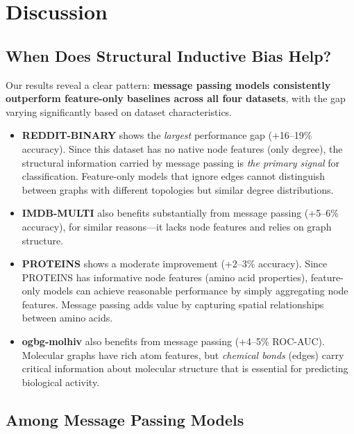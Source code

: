 \documentclass[11pt]{article}
\begin{document}
\section{Discussion}

\subsection{When Does Structural Inductive Bias Help?}

Our results reveal a clear pattern: \textbf{message passing models consistently outperform feature-only baselines across all four datasets}, with the gap varying significantly based on dataset characteristics.

\begin{itemize}
    \item \textbf{REDDIT-BINARY} shows the \textit{largest} performance gap (+16--19\% accuracy). Since this dataset has no native node features (only degree), the structural information carried by message passing is \textit{the primary signal} for classification. Feature-only models that ignore edges cannot distinguish between graphs with different topologies but similar degree distributions.
    
    \item \textbf{IMDB-MULTI} also benefits substantially from message passing (+5--6\% accuracy), for similar reasons—it lacks node features and relies on graph structure.
    
    \item \textbf{PROTEINS} shows a moderate improvement (+2--3\% accuracy). Since PROTEINS has informative node features (amino acid properties), feature-only models can achieve reasonable performance by simply aggregating node features. Message passing adds value by capturing spatial relationships between amino acids.
    
    \item \textbf{ogbg-molhiv} also benefits from message passing (+4--5\% ROC-AUC). Molecular graphs have rich atom features, but \textit{chemical bonds} (edges) carry critical information about molecular structure that is essential for predicting biological activity.
\end{itemize}

\subsection{Among Message Passing Models}
\end{document}
